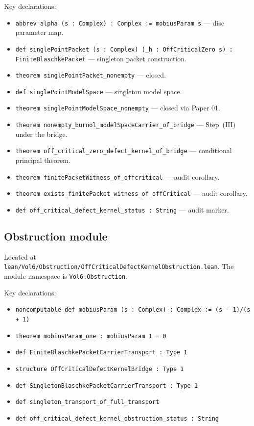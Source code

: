 \documentclass[12pt]{article}
\theoremstyle{definition}
\theoremstyle{remark}
\begin{document}
Key declarations:
\begin{itemize}
\item \texttt{abbrev alpha (s : Complex) : Complex := mobiusParam s} — disc parameter map.
\item \texttt{def singlePointPacket (s : Complex) (\_h : OffCriticalZero s) : FiniteBlaschkePacket}
   — singleton packet construction.
\item \texttt{theorem singlePointPacket\_nonempty} — closed.
\item \texttt{def singlePointModelSpace} — singleton model space.
\item \texttt{theorem singlePointModelSpace\_nonempty} — closed via
   Paper 01.
\item \texttt{theorem nonempty\_burnol\_modelSpaceCarrier\_of\_bridge}
   — Step~(III) under the bridge.
\item \texttt{theorem off\_critical\_zero\_defect\_kernel\_of\_bridge}
   — conditional principal theorem.
\item \texttt{theorem finitePacketWitness\_of\_offcritical} — audit
   corollary.
\item \texttt{theorem exists\_finitePacket\_witness\_of\_offCritical}
   — audit corollary.
\item \texttt{def off\_critical\_defect\_kernel\_status : String}
   — audit marker.
\end{itemize}

\subsection{Obstruction module}

Located at \texttt{lean/Vol6/Obstruction/OffCriticalDefectKernelObstruction.lean}.
The module namespace is \texttt{Vol6.Obstruction}.

Key declarations:
\begin{itemize}
\item \texttt{noncomputable def mobiusParam (s : Complex) : Complex := (s - 1)/(s + 1)}
\item \texttt{theorem mobiusParam\_one : mobiusParam 1 = 0}
\item \texttt{def FiniteBlaschkePacketCarrierTransport : Type 1}
\item \texttt{structure OffCriticalDefectKernelBridge : Type 1}
\item \texttt{def SingletonBlaschkePacketCarrierTransport : Type 1}
\item \texttt{def singleton\_transport\_of\_full\_transport}
\item \texttt{def off\_critical\_defect\_kernel\_obstruction\_status : String}
\end{itemize}
\end{document}
